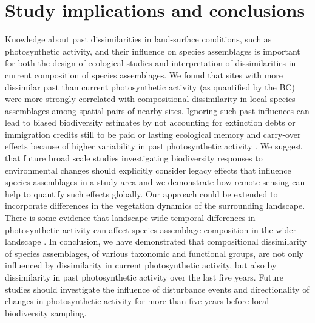 \section{Study implications and conclusions}
\label{C02_05}
Knowledge about past dissimilarities in land-surface conditions, such as photosynthetic activity, and their influence on species assemblages is important for both the design of ecological studies and interpretation of dissimilarities in current composition of species assemblages. We found that sites with more dissimilar past than current photosynthetic activity (as quantified by the BC) were more strongly correlated with compositional dissimilarity in local species assemblages among spatial pairs of nearby sites. Ignoring such past influences can lead to biased biodiversity estimates by not accounting for extinction debts or immigration credits still to be paid \citep[see ][]{Tilman1994} or lasting ecological memory and carry-over effects because of higher variability in past photosynthetic activity \citep{Rowhani2008,Cole2015,Ogle2015}. We suggest that future broad scale studies investigating biodiversity responses to environmental changes should explicitly consider legacy effects that influence species assemblages in a study area and we demonstrate how remote sensing can help to quantify such effects globally. Our approach could be extended to incorporate differences in the vegetation dynamics of the surrounding landscape. There is some evidence that landscape-wide temporal differences in photosynthetic activity can affect species assemblage composition in the wider landscape \citep{Manning2009,Fernandez2016}. In conclusion, we have demonstrated that compositional dissimilarity of species assemblages, of various taxonomic and functional groups, are not only influenced by dissimilarity in current photosynthetic activity, but also by dissimilarity in past photosynthetic activity over the last five years. Future studies should investigate the influence of disturbance events and directionality of changes in photosynthetic activity for more than five years before local biodiversity sampling.



